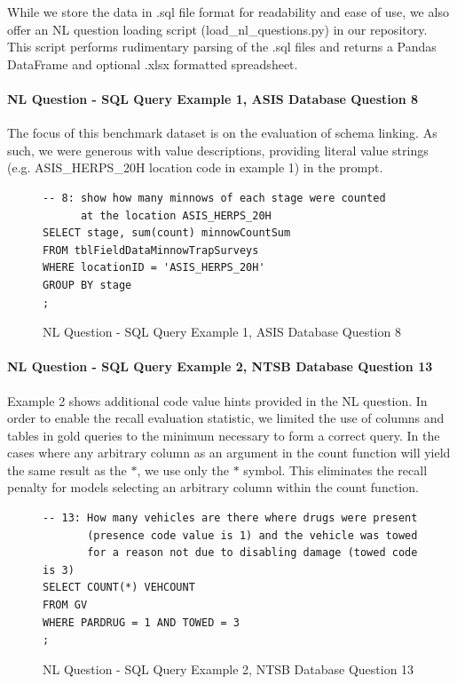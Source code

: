 While we store the data in .sql file format for readability and ease of use, we also offer an NL question loading script (load\_nl\_questions.py) in our repository. 
This script performs rudimentary parsing of the .sql files and returns a Pandas DataFrame and optional .xlsx formatted spreadsheet.

\paragraph{NL Question - SQL Query Example 1, ASIS Database Question 8}
The focus of this benchmark dataset is on the evaluation of schema linking.
As such, we were generous with value descriptions, providing literal value strings (e.g. ASIS\_HERPS\_20H location code in example 1) in the prompt.

\begin{figure}[H]
\begin{Verbatim}[frame=single,fillcolor=\color{lightgray}]
-- 8: show how many minnows of each stage were counted 
      at the location ASIS_HERPS_20H
SELECT stage, sum(count) minnowCountSum
FROM tblFieldDataMinnowTrapSurveys
WHERE locationID = 'ASIS_HERPS_20H'
GROUP BY stage
;
\end{Verbatim}
\caption{NL Question - SQL Query Example 1, ASIS Database Question 8}
\end{figure}

\paragraph{NL Question - SQL Query Example 2, NTSB Database Question 13}
Example 2 shows additional code value hints provided in the NL question.
In order to enable the recall evaluation statistic, we limited the use of columns and tables in gold queries to the minimum necessary to form a correct query.
In the cases where any arbitrary column as an argument in the count function will yield the same result as the $\ast$, we use only the $\ast$ symbol. 
This eliminates the recall penalty for models selecting an arbitrary column within the count function.


\begin{figure}[H]
\begin{Verbatim}[frame=single,fillcolor=\color{lightgray}]
-- 13: How many vehicles are there where drugs were present 
       (presence code value is 1) and the vehicle was towed 
       for a reason not due to disabling damage (towed code is 3)
SELECT COUNT(*) VEHCOUNT
FROM GV
WHERE PARDRUG = 1 AND TOWED = 3
;
\end{Verbatim}
\caption{NL Question - SQL Query Example 2, NTSB Database Question 13}
\end{figure}


